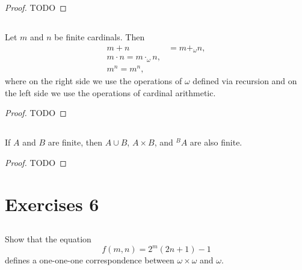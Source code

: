\documentclass{report}
\begin{document}
  \begin{proof}
    TODO
  \end{proof}

\subsection{}%

  Let $m$ and $n$ be finite cardinals.
  Then
    \begin{align*}
      m + n & = m +_\omega n, \\
      m \cdot n = m \cdot_\omega n, \\
      m^n = m^n,
    \end{align*}
    where on the right side we use the operations of $\omega$ defined via
    recursion and on the left side we use the operations of cardinal arithmetic.

  \begin{proof}
    TODO
  \end{proof}

\subsection{}%

  If $A$ and $B$ are finite, then $A \cup B$, $A \times B$, and $^B{A}$ are also
    finite.

  \begin{proof}
    TODO
  \end{proof}

\section{Exercises 6}%

\subsection{}%

  Show that the equation $$f(m, n) = 2^m(2n + 1) - 1$$ defines a one-one-one
    correspondence between $\omega \times \omega$ and $\omega$.
\end{document}
